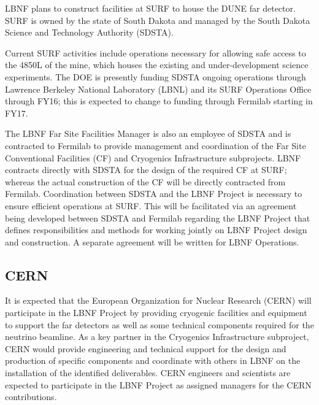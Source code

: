 LBNF plans to construct facilities at SURF to house the DUNE far detector. SURF is owned by the state of South Dakota and managed by the South Dakota Science and Technology Authority (SDSTA). 

Current SURF activities include operations necessary for allowing safe access to the 4850L of the mine, which houses the existing and under-development science experiments. The DOE is presently funding SDSTA ongoing operations through Lawrence Berkeley National Laboratory (LBNL) and its SURF Operations Office through FY16; this is expected to change to funding through Fermilab starting in FY17. 

The LBNF Far Site Facilities Manager is also an employee of SDSTA and is contracted to Fermilab to provide management and coordination of the Far Site Conventional Facilities (CF) and Cryogenics Infrastructure subprojects. LBNF contracts directly with SDSTA for the design of the required CF at SURF; whereas the actual construction of the CF will be directly contracted from Fermilab. Coordination between SDSTA and the LBNF Project is necessary to ensure efficient operations at SURF. This will be facilitated via an agreement being developed between SDSTA and Fermilab regarding the LBNF Project  that defines responsibilities and methods for working jointly on LBNF Project design and construction. A separate agreement will be written for LBNF Operations. 

\subsection{CERN}

It is expected that the European Organization for Nuclear Research (CERN) will participate in the LBNF Project by providing cryogenic facilities and equipment to support the far detectors as well as some technical components required for the neutrino beamline. As a key partner in the Cryogenics Infrastructure subproject, CERN would provide engineering and technical support for the design and production of specific components and coordinate with others in LBNF on the installation of the identified deliverables. CERN engineers and scientists are expected to participate in the LBNF Project as assigned managers for the CERN contributions.

